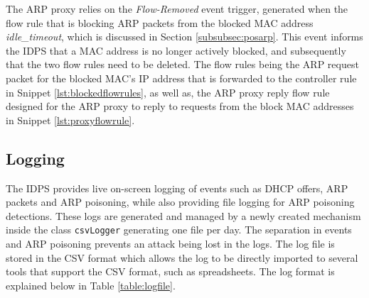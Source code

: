 \documentclass[12pt, oneside]{book}
\begin{document}
The ARP proxy relies on the \emph{Flow-Removed} event trigger, generated when the flow rule that is blocking ARP packets from the 
blocked MAC address \emph{idle\_timeout}, which is discussed in Section \ref{subsubsec:posarp}.
This event informs the IDPS that a MAC address is no longer actively blocked, and subsequently that the two flow rules
need to be deleted. The flow rules being the ARP request packet for the blocked MAC's IP address that is forwarded to the controller rule in Snippet \ref{lst:blockedflowrules},
as well as, the ARP proxy reply flow rule designed for the ARP proxy to reply to requests from the block MAC addresses in Snippet \ref{lst:proxyflowrule}. 

\subsection{Logging}
\label{subsec:logging}
The IDPS provides live on-screen logging of events such as DHCP offers, ARP packets and ARP poisoning, while also 
providing file logging for ARP poisoning detections. These logs are generated and managed by a newly created mechanism inside the 
class \lstinline{csvLogger} generating one file per day. The separation
in events and ARP poisoning prevents an attack being lost in the logs. The log file is stored in the CSV format which allows
the log to be directly imported to several tools that support the CSV format, such as spreadsheets. The log format is explained
below in Table \ref{table:logfile}.
\end{document}
